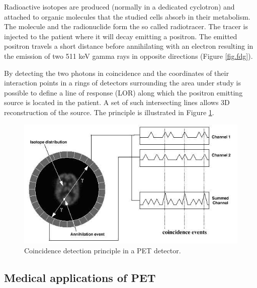 Radioactive isotopes are produced (normally in a dedicated cyclotron) and attached to organic molecules that the studied cells absorb in their metabolism. The molecule and the radionuclide form the so called radiotracer. The tracer is injected to the patient where it will decay emitting a positron. The emitted positron travels a short distance before annihilating with an electron resulting in the emission of two 511 keV gamma rays in opposite directions (Figure \ref{fig.fdg}).

By detecting the two photons in coincidence and the coordinates of their interaction points in a rings of detectors surrounding the area under study is possible to define a line of response (LOR) along which the positron emitting source is located in the patient. A set of such intersecting lines allows 3D reconstruction of the source. The principle is illustrated in Figure \ref{fig.pet}.

\begin{figure}[!bthp]
	\centering
	\includegraphics[scale=1.0]{img/MAPD_coincidenceprinciple.jpg}
	\caption{\label{fig.pet} Coincidence detection principle in a PET detector.}
\end{figure}

\subsection{Medical applications of PET}



